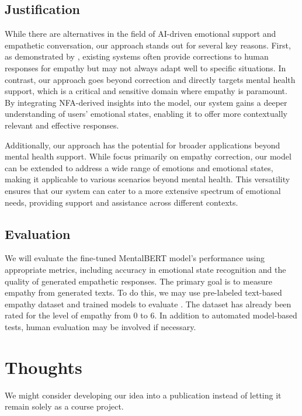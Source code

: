 \documentclass[conference,compsoc]{IEEEtran}
\begin{document}
\subsection{Justification}
While there are alternatives in the field of AI-driven emotional support and empathetic conversation, our approach stands out for several key reasons. First, as demonstrated by \citet{Sharma+23:human-ai-empathic-conversation}, existing systems often provide corrections to human responses for empathy but may not always adapt well to specific situations. In contrast, our approach goes beyond correction and directly targets mental health support, which is a critical and sensitive domain where empathy is paramount. By integrating NFA-derived insights into the model, our system gains a deeper understanding of users' emotional states, enabling it to offer more contextually relevant and effective responses.

Additionally, our approach has the potential for broader applications beyond mental health support. While \citet{Sharma+20:empathy-mental-health} focus primarily on empathy correction, our model can be extended to address a wide range of emotions and emotional states, making it applicable to various scenarios beyond mental health. This versatility ensures that our system can cater to a more extensive spectrum of emotional needs, providing support and assistance across different contexts.

\subsection{Evaluation}
We will evaluate the fine-tuned MentalBERT model's performance using appropriate metrics, including accuracy in emotional state recognition and the quality of generated empathetic responses. The primary goal is to measure empathy from generated texts. To do this, we may use pre-labeled text-based empathy dataset and trained models to evaluate \citep{Sharma+20:empathy-mental-health}. The dataset has already been rated for the level of empathy from 0 to 6. In addition to automated model-based tests, human evaluation may be involved if necessary. 

\section{Thoughts}
We might consider developing our idea into a publication instead of letting it remain solely as a course project.







\end{document}
